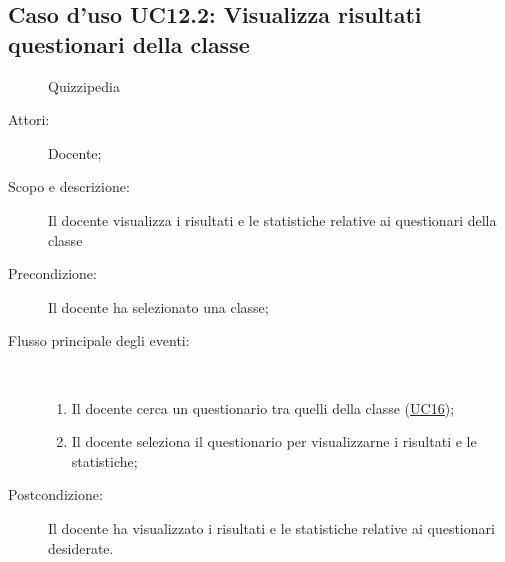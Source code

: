 \subsection{Caso d'uso UC12.2: Visualizza risultati questionari della classe}
	\begin{figure}[H]
		\centering
		\begin{resizedtikzpicture}{\textwidth}
		\begin{umlsystem}[x=0, fill=lightgray!20]{Quizzipedia}
		\end{umlsystem}
		\end{resizedtikzpicture}
		\caption{}
	\end{figure}
\begin{description}
\item[Attori:] Docente;
\item[Scopo e descrizione:] Il docente visualizza i risultati e le statistiche relative ai questionari della classe
      \item[Precondizione:] Il docente ha selezionato una classe;

        \item[Flusso principale degli eventi:] \ 
 \begin{enumerate}
          \item Il docente cerca un questionario tra quelli della classe (\hyperlink{UC16}{UC16});
          \item Il docente seleziona il questionario per visualizzarne i risultati e le statistiche;

      \end{enumerate}
    \item[Postcondizione:] Il docente ha visualizzato i risultati e le statistiche relative ai questionari desiderate.
  \end{description}
\hypertarget{UC12.3}{}
